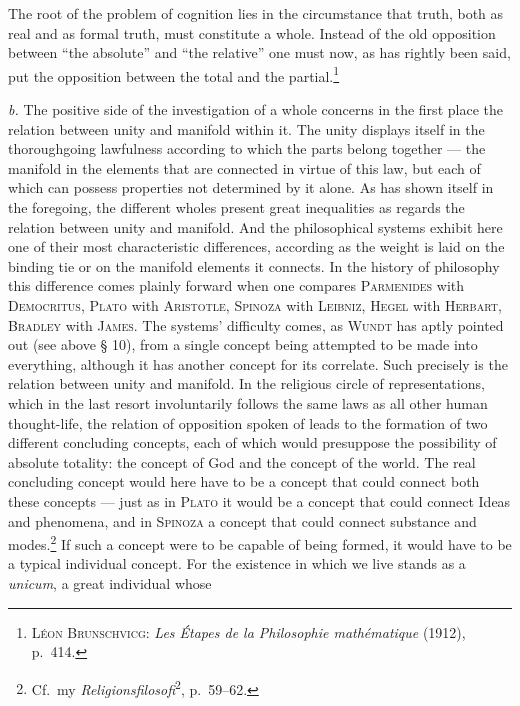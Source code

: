 \documentclass[12pt]{book}
\newcommand{\opage}[1]{\marginnote{\footnotesize\textit{[#1]}}}
\begin{document}
The root of the problem of cognition lies in the circumstance that truth, both as real and
as formal truth, must constitute a whole. Instead of the old \opage{77}opposition between ``the
absolute'' and ``the relative'' one must now, as has rightly been said, put the opposition
between the total and the partial.\footnote{\textsc{Léon Brunschvicg}: \textit{Les Étapes de
la Philosophie mathématique} (1912), p.\ 414.}

\textit{b.} The positive side of the investigation of a whole concerns in the first place the
relation between unity and manifold within it. The unity displays itself in the thoroughgoing
lawfulness according to which the parts belong together --- the manifold in the elements that
are connected in virtue of this law, but each of which can possess properties not determined
by it alone. As has shown itself in the foregoing, the different wholes present great
inequalities as regards the relation between unity and manifold. And the philosophical systems
exhibit here one of their most characteristic differences, according as the weight is laid on
the binding tie or on the manifold elements it connects. In the history of philosophy this
difference comes plainly forward when one compares \textsc{Parmenides} with \textsc{Democritus},
\textsc{Plato} with \textsc{Aristotle}, \textsc{Spinoza} with \textsc{Leibniz}, \textsc{Hegel}
with \textsc{Herbart}, \textsc{Bradley} with \textsc{James}. The systems' difficulty comes, as
\textsc{Wundt} has aptly pointed out (see above § 10), from a single concept being attempted to
be made into everything, although it has another concept for its correlate. Such precisely is
the relation between unity and manifold. In the religious circle of representations, which in
the last resort involuntarily follows the same laws as all other human thought-life, the
relation of opposition spoken of leads to the formation of two different concluding concepts,
each of which would presuppose the possibility of absolute totality: the concept of God and the
concept of the world. The real concluding concept would here have to be a concept that could
connect both these concepts --- just as in \textsc{Plato} it would be a concept that could
connect Ideas and phenomena, and in \textsc{Spinoza} a concept that could connect substance and
modes.\footnote{Cf.\ my \textit{Religionsfilosofi}\textsuperscript{2}, p.\ 59--62.} If such a
concept were to be capable of being formed, it would have to be a typical individual concept.
For the existence in which we live stands as a \textit{unicum}, a great individual whose
\end{document}
